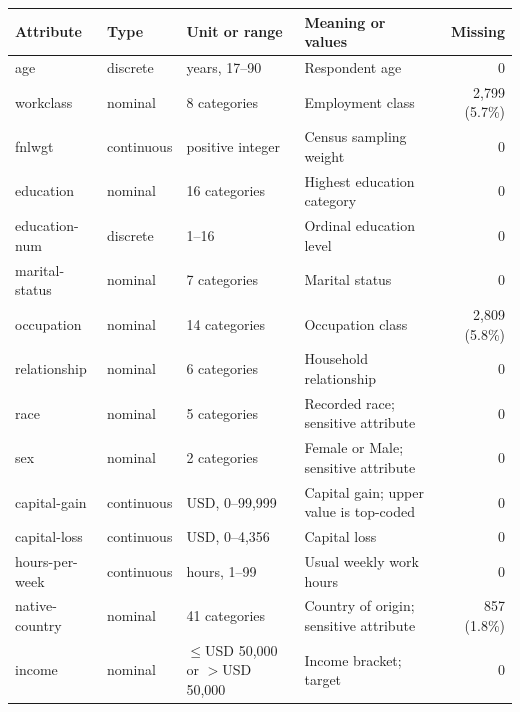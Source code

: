 \documentclass[11pt,a4paper]{article}
\newcommand{\code}[1]{{\small\ttfamily #1}}
\newcommand{\stripe}{\rowcolors{2}{tint}{white}}
\begin{document}
\begin{table}[H]
\centering\stripe
\scriptsize
\begin{tabularx}{\textwidth}{@{}l l l X r@{}}
\toprule
\rowcolor{white}\textbf{Attribute} & \textbf{Type} & \textbf{Unit or range} & \textbf{Meaning or values} & \textbf{Missing}\\
\midrule
\code{age} & discrete & years, 17--90 & Respondent age & 0\\
\code{workclass} & nominal & 8 categories & Employment class & 2,799 (5.7\%)\\
\code{fnlwgt} & continuous & positive integer & Census sampling weight & 0\\
\code{education} & nominal & 16 categories & Highest education category & 0\\
\code{education-num} & discrete & 1--16 & Ordinal education level & 0\\
\code{marital-status} & nominal & 7 categories & Marital status & 0\\
\code{occupation} & nominal & 14 categories & Occupation class & 2,809 (5.8\%)\\
\code{relationship} & nominal & 6 categories & Household relationship & 0\\
\code{race} & nominal & 5 categories & Recorded race; sensitive attribute & 0\\
\code{sex} & nominal & 2 categories & Female or Male; sensitive attribute & 0\\
\code{capital-gain} & continuous & USD, 0--99,999 & Capital gain; upper value is top-coded & 0\\
\code{capital-loss} & continuous & USD, 0--4,356 & Capital loss & 0\\
\code{hours-per-week} & continuous & hours, 1--99 & Usual weekly work hours & 0\\
\code{native-country} & nominal & 41 categories & Country of origin; sensitive attribute & 857 (1.8\%)\\
\code{income} & nominal & $\le$USD 50,000 or $>$USD 50,000 & Income bracket; target & 0\\
\bottomrule
\end{tabularx}
\end{table}
\end{document}
